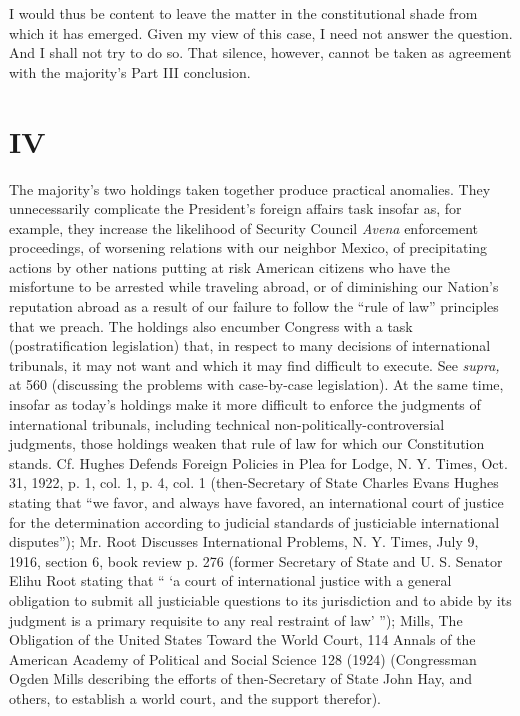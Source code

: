   I would thus be content to leave the matter in the constitutional
shade from which it has emerged. Given my view of this case, I need
not answer the question. And I shall not try to do so. That silence,
however, cannot be taken as agreement with the majority's Part III
conclusion.

\section{IV}

  The majority's two holdings taken together produce practical
anomalies. They unnecessarily complicate the President's foreign
affairs task insofar as, for example, they increase the likelihood
of Security Council \emph{Avena} enforcement proceedings, of worsening
relations with our neighbor Mexico, of precipitating actions by other
nations putting at risk American citizens who have the misfortune to
be arrested while traveling abroad, or of diminishing our Nation's
reputation abroad as a result of our failure to follow the ``rule
of law'' principles that we preach. The holdings also encumber
Congress with a task (postratification legislation) that, in respect
to many decisions of international tribunals, it may not want and
which it may find difficult to execute. See \emph{supra,} at 560
(discussing the problems with case-by-case legislation). At the
same time, insofar as today's holdings make it more difficult to
enforce the judgments of international tribunals, including technical
non-politically-controversial judgments, those holdings weaken that rule
of law for which our Constitution stands. Cf. Hughes Defends Foreign
Policies in Plea for Lodge, N. Y. Times, Oct. 31, 1922, p. 1, col. 1,
p. 4, col. 1 (then-Secretary of State Charles Evans Hughes stating that
``we favor, and always have favored, an inter\newpage national court
of justice for the determination according to judicial standards of
justiciable international disputes''); Mr. Root Discusses International
Problems, N. Y. Times, July 9, 1916, section 6, book review p. 276
(former Secretary of State and U. S. Senator Elihu Root stating that
`` ‘a court of international justice with a general obligation to
submit all justiciable questions to its jurisdiction and to abide by
its judgment is a primary requisite to any real restraint of law'
''); Mills, The Obligation of the United States Toward the World Court,
114 Annals of the American Academy of Political and Social Science 128
(1924) (Congressman Ogden Mills describing the efforts of then-Secretary
of State John Hay, and others, to establish a world court, and the
support therefor).

